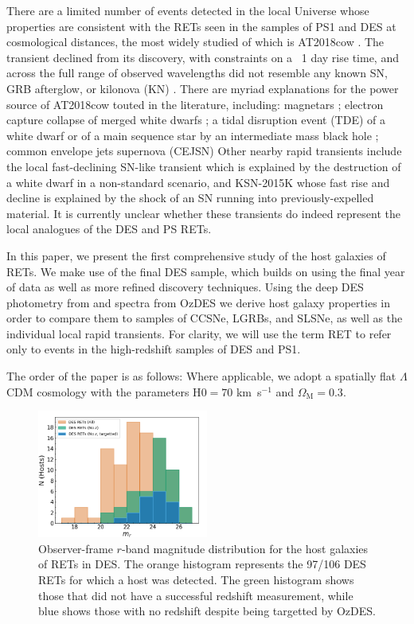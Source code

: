 \documentclass[fleqn,usenatbib,]{mnras}
\begin{document}
There are a limited number of events detected in the local Universe whose properties are consistent with the RETs seen in the samples of PS1 and DES at cosmological distances, the most widely studied of which is AT2018cow \citep[e.g.][]{Prentice2018,Perley2019}. The transient declined from its discovery, with constraints on a ~1 day rise time, and across the full range of observed wavelengths did not resemble any known SN, GRB afterglow, or kilonova (KN) \citep{Ho2019}. There are myriad explanations for the power source of AT2018cow touted in the literature, including: magnetars \citep{Mohan2020}; electron capture collapse of merged white dwarfs \citep{Lyutikov2019}; a tidal disruption event (TDE) of a white dwarf \citep{Kuin2019} or of a main sequence star by an intermediate mass black hole \citep{Perley2019}; common envelope jets supernova (CEJSN) \citep{Soker2019}
Other nearby rapid transients include the local fast-declining SN-like transient \citep{McBrien2019} which is explained by the destruction of a white dwarf in a non-standard scenario, and KSN-2015K \citep{Rest2018} whose fast rise and decline is explained by the shock of an SN running into previously-expelled material.  It is currently unclear whether these transients do indeed represent the local analogues of the DES and PS RETs.

In this paper, we present the first comprehensive study of the host galaxies of RETs. We make use of the final DES sample, which builds on \citet{Pursiainen2018} using the final year of data as well as more refined discovery techniques. Using the deep DES photometry from \citet{Wiseman2020} and spectra from OzDES \citep{Lidman2020} we derive host galaxy properties in order to compare them to samples of CCSNe, LGRBs, and SLSNe, as well as the individual local rapid transients. For clarity, we will use the term RET to refer only to events in the high-redshift samples of DES and PS1. 

The order of the paper is as follows:
Where applicable, we adopt a spatially flat $\Lambda$CDM cosmology with the parameters H$0=70$ km~s$^{-1}$ and $\Omega_{\textrm{M}}=0.3$.


\begin{figure}
\includegraphics[width=0.5\textwidth]{figs/mag_dist.png}
\caption{Observer-frame $r$-band magnitude distribution for the host galaxies of RETs in DES. The orange histogram represents the 97/106 DES RETs for which a host was detected. The green histogram shows those that did not have a successful redshift measurement, while blue shows those with no redshift despite being targetted by OzDES.
\label{fig:mag_dist}}
\end{figure}
\end{document}
